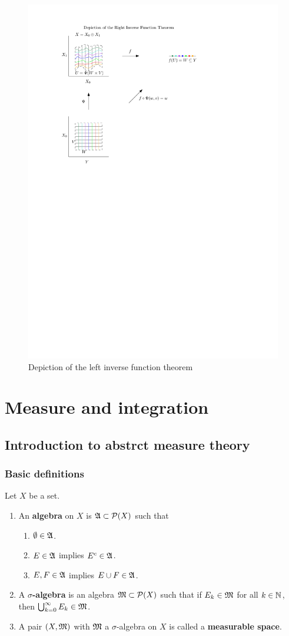 \documentclass[a4paper]{article}
\begin{document}
\begin{figure}[h!]
  \centering
  \includegraphics[width=0.55\linewidth]{fig/right_inverse.pdf}
  \caption{Depiction of the left inverse function theorem}
\end{figure}


\section{Measure and integration}

\subsection{Introduction to abstrct measure theory}

\subsubsection{Basic definitions}

\begin{defi}
  Let $X$ be a set.
  \begin{enumerate}
    \item An \textbf{algebra} on $X$ is $\mathfrak{A} \subset
    \mathcal{P}(X)$ such that
    \begin{enumerate}
      \item $\emptyset \in \mathfrak{A}$.
      \item $E \in \mathfrak{A}$ implies $E^c \in \mathfrak{A}$.
      \item $E, F \in \mathfrak{A}$ implies $E \cup F \in \mathfrak{A}$.
    \end{enumerate}

    \item A \textbf{$\sigma$-algebra} is an algebra
    $\mathfrak{M} \subset \mathcal{P}(X)$ such that if
    $E_k \in \mathfrak{M}$ for all $k \in \mathbb{N}$, then
    $\bigcup_{k=0}^\infty E_k \in \mathfrak{M}$.

    \item A pair $(X, \mathfrak{M})$ with $\mathfrak{M}$ a $\sigma$-algebra
    on $X$ is called a \textbf{measurable space}.
  \end{enumerate}
\end{defi}
\end{document}
